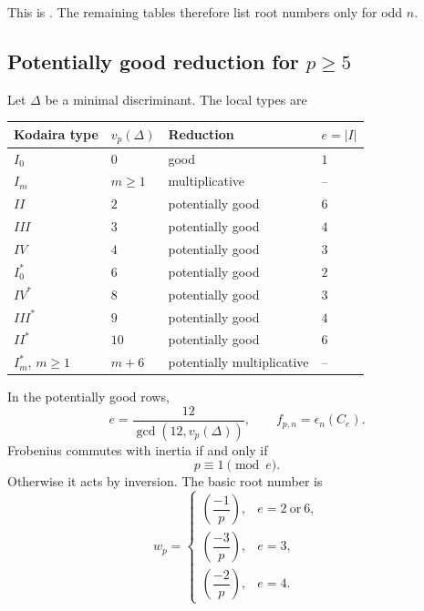\documentclass[11pt,reqno]{amsart}
\theoremstyle{definition}
\theoremstyle{remark}
\begin{document}
This is \cite[Proposition~7.1]{DMW}.  The remaining tables therefore list
root numbers only for odd
$n$.

\subsection{Potentially good reduction for \texorpdfstring{$p\geq5$}{p at least 5}}

Let $\Delta$ be a minimal discriminant.  The local types are
\begin{center}
\renewcommand{\arraystretch}{1.15}
\begin{tabular}{@{}llll@{}}
\toprule
Kodaira type & $v_p(\Delta)$ & Reduction & $e=|I|$ \\
\midrule
$I_0$ & $0$ & good & $1$ \\
$I_m$ & $m\geq1$ & multiplicative & -- \\
$II$ & $2$ & potentially good & $6$ \\
$III$ & $3$ & potentially good & $4$ \\
$IV$ & $4$ & potentially good & $3$ \\
$I_0^*$ & $6$ & potentially good & $2$ \\
$IV^*$ & $8$ & potentially good & $3$ \\
$III^*$ & $9$ & potentially good & $4$ \\
$II^*$ & $10$ & potentially good & $6$ \\
$I_m^*$, $m\geq1$ & $m+6$ & potentially multiplicative & -- \\
\bottomrule
\end{tabular}
\end{center}
In the potentially good rows,
\begin{equation}\label{eq:e-Kodaira}
 e=\frac{12}{\gcd(12,v_p(\Delta))},
 \qquad
 f_{p,n}=\epsilon_n(C_e).
\end{equation}
Frobenius commutes with inertia if and only if
\begin{equation}\label{eq:Frob-commute}
 p\equiv1\pmod e.
\end{equation}
Otherwise it acts by inversion.  The basic root number is
\begin{equation}\label{eq:wp-tame}
 w_p=
 \begin{cases}
 \left(\dfrac{-1}{p}\right),&e=2\ \text{or}\ 6,\\[1mm]
 \left(\dfrac{-3}{p}\right),&e=3,\\[1mm]
 \left(\dfrac{-2}{p}\right),&e=4.
 \end{cases}
\end{equation}
\end{document}
